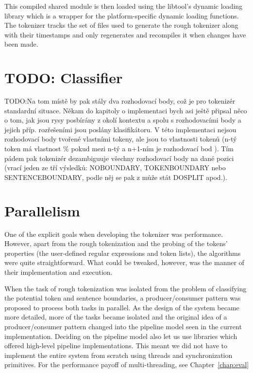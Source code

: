 This compiled shared module is then loaded using the libtool's dynamic loading
library \cite{web-libtool} which is a wrapper for the platform-specific dynamic
loading functions. The tokenizer tracks the set of files used to generate the
rough tokenizer along with their timestamps and only regenerates and recompiles
it when changes have been made.

\section{TODO: Classifier}

TODO:Na tom místě by pak stály dva rozhodovací body, což je pro tokenizér
standardní situace. Někam do kapitoly o implementaci bych asi ještě připsal
něco o tom, jak jsou rysy posbírány z okolí kontextu a spolu s rozhodovacími
body a jejich příp. rozřešeními jsou poslány klasifikátoru. V této implementaci
nejsou rozhodovací body tvořené vlastními tokeny, ale jsou to vlastnosti tokenů
(n-tý token má vlastnost \%\maysplit{} pokud mezi n-tý a n+1-ním je rozhodovací
bod \maysplit{}). Tím pádem pak tokenizér dezambiguuje všechny rozhodovací body
na dané pozici (vrací jeden ze tří výsledků: NOBOUNDARY, TOKENBOUNDARY nebo
SENTENCEBOUNDARY, podle něj se pak z \maysplit{} může stát DOSPLIT apod.).


\section{Parallelism}
\label{sec:impl-parallel}

One of the explicit goals when developing the tokenizer was performance.
However, apart from the rough tokenization and the probing of the tokens'
properties (the user-defined regular expressions and token lists), the
algorithms were quite straightforward. What could be tweaked, however, was the
manner of their implementation and execution. 

When the task of rough tokenization was isolated from the problem of
classifying the potential token and sentence boundaries, a producer/consumer
pattern was proposed to process both tasks in parallel. As the design of the
system became more detailed, more of the tasks became isolated and the original
idea of a producer/consumer pattern changed into the pipeline model seen in the
current implementation. Deciding on the pipeline model also let us use
libraries which offered high-level pipeline implementations. This meant we did
not have to implement the entire system from scratch using threads and
synchronization primitives. For the performance payoff of multi-threading, see
Chapter~\ref{chap:eval}

